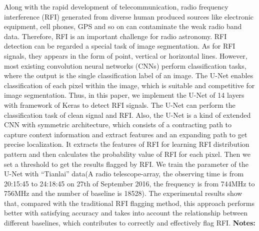 \documentclass{report}
\begin{document}
{{{{{{{{{{{{{{{{{{{{{{{{{{{{{{{{{{{{{{{{Along with the rapid development of telecommunication, radio frequency interference (RFI) generated from diverse human produced sources like electronic equipment, cell phones, GPS and so on can contaminate the weak radio band data. Therefore, RFI is an important challenge for radio astronomy. RFI detection can be regarded a special task of image segmentation. As for RFI signals, they appears in the form of point, vertical or horizontal lines. However, most existing convolution neural networks (CNNs) perform classification tasks, where the output is the single classification label of an image. The U-Net enables classification of each pixel within the image, which is suitable and competitive for image segmentation. Thus, in this paper, we implement the U-Net of 14 layers with framework of Keras to detect RFI signals. The U-Net can perform the classification task of clean signal and RFI. Also, the U-Net is a kind of extended CNN with symmetric architecture, which consists of a contracting path to capture context information and extract features and an expanding path to get precise localization. It extracts the features of RFI for learning RFI distribution pattern and then calculates the probability value of RFI for each pixel. Then we set a threshold to get the results flagged by RFI. We train the parameter of the U-Net with “Tianlai” data(A radio telescope-array, the observing time is from 20:15:45 to 24:18:45 on 27th of September 2016, the frequency is from 744MHz to 756MHz and the number of baseline is 18528). The experimental results show that, compared with the traditional RFI flagging method, this approach performs better with satisfying accuracy and takes into account the relationship between different baselines, which contributes to correctly and effectively flag RFI.\newline
{\bf Notes:}\newline
{\newpage
}}}}}}}}}}}}}}}}}}}}}}}}}}}}}}}}}}}}}}}}}
\end{document}
